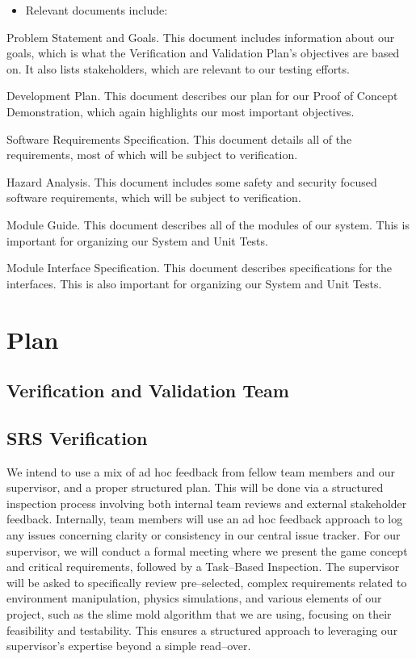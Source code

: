 \documentclass[12pt, titlepage]{article}
\begin{document}
\begin{itemize}
  \item Relevant documents include:
\end{itemize}

Problem Statement and Goals. This document includes information about our goals, which is what the Verification and Validation Plan’s objectives are based on. It also lists stakeholders, which are relevant to our testing efforts.

Development Plan. This document describes our plan for our Proof of Concept Demonstration, which again highlights our most important objectives.

Software Requirements Specification. This document details all of the requirements, most of which will be subject to verification.

Hazard Analysis. This document includes some safety and security focused software requirements, which will be subject to verification.

Module Guide. This document describes all of the modules of our system. This is important for organizing our System and Unit Tests.

Module Interface Specification. This document describes specifications for the interfaces. This is also important for organizing our System and Unit Tests.

\section{Plan}

\subsection{Verification and Validation Team}


\subsection{SRS Verification}

We intend to use a mix of ad hoc feedback from fellow team members and our supervisor, and a proper structured plan. This will be done via a structured inspection process involving both internal team reviews and external stakeholder feedback. Internally, team members will use an ad hoc feedback approach to log any issues concerning clarity or consistency in our central issue tracker. For our supervisor, we will conduct a formal meeting where we present the game concept and critical requirements, followed by a Task--Based Inspection. The supervisor will be asked to specifically review pre--selected, complex requirements related to environment manipulation, physics simulations, and various elements of our project, such as the slime mold algorithm that we are using, focusing on their feasibility and testability. This ensures a structured approach to leveraging our supervisor's expertise beyond a simple read--over.
\end{document}
